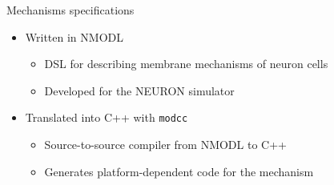 \documentclass[aspectratio=1610,14pt]{beamer}
\begin{document}
\begin{frame}{Mechanisms specifications}
  \begin{itemize}
  \item Written in NMODL
    \begin{itemize}
    \item DSL for describing membrane mechanisms of neuron cells
    \item Developed for the NEURON simulator
    \end{itemize}
  \item Translated into C++ with \texttt{modcc}
    \begin{itemize}
    \item Source-to-source compiler from NMODL to C++
    \item Generates platform-dependent code for the mechanism
    \end{itemize}
  \end{itemize}
\end{frame}
\end{document}
